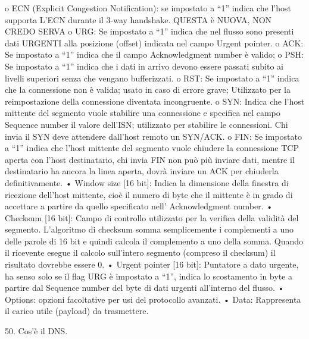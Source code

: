 o	ECN (Explicit Congestion Notification): se impostato a “1” indica che l’host supporta L’ECN durante il 3-way handshake. QUESTA è NUOVA, NON CREDO SERVA
o	URG: Se impostato a “1” indica che nel flusso sono presenti dati URGENTI alla posizione (offset) indicata nel campo Urgent pointer.
o	ACK: Se impostato a “1” indica che il campo Acknowledgment number è valido;
o	PSH: Se impostato a “1” indica che i dati in arrivo devono essere passati subito ai livelli superiori senza che vengano bufferizzati.
o	RST: Se impostato a “1” indica che la connessione non è valida; usato in caso di errore grave; Utilizzato per la reimpostazione della connessione diventata incongruente.
o	SYN: Indica che l’host mittente del segmento vuole stabilire una connessione e specifica nel campo Sequence number il valore dell’ISN; utilizzato per stabilire le connessioni. Chi invia il SYN deve attendere dall’host remoto un SYN/ACK.
o	FIN: Se impostato a “1” indica che l’host mittente del segmento vuole chiudere la connessione TCP aperta con l’host destinatario, chi invia FIN non può più inviare dati, mentre il destinatario ha ancora la linea aperta, dovrà inviare un ACK per chiuderla definitivamente.
•	Window size [16 bit]: Indica la dimensione della finestra di ricezione dell’host mittente, cioè il numero di byte che il mittente è in grado di accettare a partire da quello specificato nell’ Acknowledgment number.
•	Checksum [16 bit]: Campo di controllo utilizzato per la verifica della validità del segmento. L’algoritmo di checksum somma semplicemente i complementi a uno delle parole di 16 bit e quindi calcola il complemento a uno della somma. Quando il ricevente esegue il calcolo sull’intero segmento (compreso il checksum) il risultato dovrebbe essere 0.
•	Urgent pointer [16 bit]: Puntatore a dato urgente, ha senso solo se il flag URG è impostato a “1”, indica lo scostamento in byte a partire dal Sequence number del byte di dati urgenti all’interno del flusso.
•	Options: opzioni facoltative per usi del protocollo avanzati.
•	Data: Rappresenta il carico utile (payload) da trasmettere.
 

50.	Cos’è il DNS.

